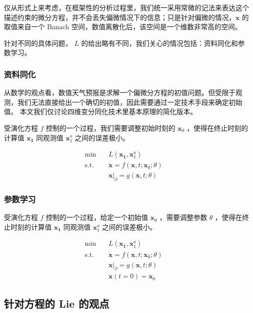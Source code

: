 \documentclass[a4paper,12pt]{article}
\begin{document}
仅从形式上来考虑，在框架性的分析过程里，我们统一采用常微的记法来表达这个描述约束的微分方程，并不会丢失偏微情况下的信息；只是针对偏微的情况，$ \mathbf{x} $ 的取值来自一个 Banach 空间，数值离散化后，该空间是一个维数非常高的空间。

针对不同的具体问题， $ L $ 的给出略有不同，我们关心的情况包括：资料同化和参数学习。

\subsubsection{资料同化}

从数学的观点看，数值天气预报是求解一个偏微分方程的初值问题。但受限于观测，我们无法直接给出一个确切的初值，因此需要通过一定技术手段来确定初始值。
本文我们仅讨论四维变分同化技术里基本原理的简化版本。

受演化方程 $ f $ 控制的一个过程，我们需要调整初始时刻的 $ \mathbf{x}_0 $ ，使得在终止时刻的计算值 $ \mathbf{x_1} $ 同观测值 $ \mathbf{x}_1^o $ 之间的误差极小。

$$
\begin{array}{rcll}
\min &~& L(\mathbf{x_1}, \mathbf{x}_1^o) & \\
\mathrm{s.t.} &~& \dot{\mathbf{x}} = f(\mathbf{x}, t; \mathbf{x}_0; \theta) & \\
&~& \mathbf{x}|_{ \partial } = g(\mathbf{x}, t; \theta)
\end{array}
$$

\subsubsection{参数学习}

受演化方程 $ f $ 控制的一个过程，给定一个初始值 $ \mathbf{x}_0 $ ，需要调整参数 $ \theta $ ，使得在终止时刻的计算值 $ \mathbf{x_1} $ 同观测值 $ \mathbf{x}_1^o $ 之间的误差极小。

$$
\begin{array}{rcll}
\min &~& L(\mathbf{x_1}, \mathbf{x}_1^o) & \\
\mathrm{s.t.} &~& \dot{\mathbf{x}} = f(\mathbf{x}, t; \mathbf{x}_0; \theta) & \\
&~& \mathbf{x}|_{ \partial } = g(\mathbf{x}, t; \theta) & \\
&~& \mathbf{x}(t=0) = \mathbf{x}_0
\end{array}
$$

\subsection{针对方程的 Lie 的观点}
\end{document}
